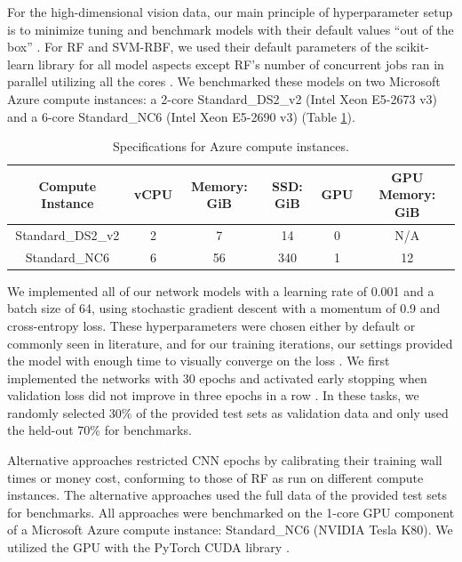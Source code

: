 For the high-dimensional vision data, our main principle of hyperparameter setup is to minimize tuning and benchmark models with their default values ``out of the box'' \citep{Probst2019hy}. For RF and SVM-RBF, we used their default parameters of the scikit-learn library for all model aspects except RF's number of concurrent jobs ran in parallel utilizing all the cores \citep{scikit-learn}. We benchmarked these models on two Microsoft Azure compute instances: a 2-core Standard\_DS2\_v2 (Intel Xeon E5-2673 v3) and a 6-core Standard\_NC6 (Intel Xeon E5-2690 v3) (Table \ref{table:azure}).

\begin{table}[htb]
\centering
\begin{tabular}{ |c|c|c|c|c|c| } 
\hline
Compute Instance & vCPU & Memory: GiB & SSD: GiB & GPU & GPU Memory: GiB \\
\hline
Standard\_DS2\_v2 & 2 & 7 & 14 & 0 & N/A \\
\hline
Standard\_NC6 & 6 & 56 & 340 & 1 & 12 \\
\hline
\end{tabular}
\caption{Specifications for Azure compute instances.}
\label{table:azure}
\end{table}

We implemented all of our network models with a learning rate of 0.001 and a batch size of 64, using stochastic gradient descent with a momentum of 0.9 and cross-entropy loss. These hyperparameters were chosen either by default or commonly seen in literature, and for our training iterations, our settings provided the model with enough time to visually converge on the loss \citep{Krizhevsky2012-sq, pmlr-v119-rice20a}.
We first implemented the networks with 30 epochs and activated early stopping when validation loss did not improve in three epochs in a row \citep{li2020, lutz, caruana}. In these tasks, we randomly selected 30\% of the provided test sets as validation data and only used the held-out 70\% for benchmarks.

Alternative approaches restricted CNN epochs by calibrating their training wall times or money cost, conforming to those of RF as run on different compute instances. The alternative approaches used the full data of the provided test sets for benchmarks. All approaches were benchmarked on the 1-core GPU component of a Microsoft Azure compute instance: Standard\_NC6 (NVIDIA Tesla K80).
We utilized the GPU with the PyTorch CUDA library \citep{pytorch}.

